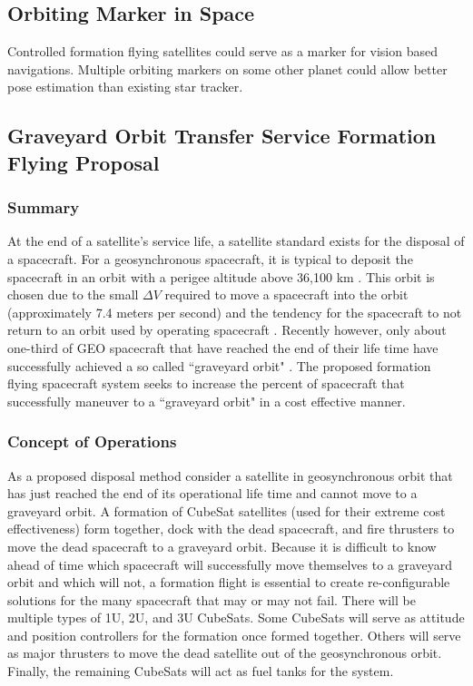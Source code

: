 \subsection{Orbiting Marker in Space}
Controlled formation flying satellites could serve as a marker for vision based navigations. Multiple orbiting markers on some other planet could allow better pose estimation than existing star tracker.

\subsection{Graveyard Orbit Transfer Service Formation Flying Proposal}
\subsubsection{Summary}
At the end of a satellite's service life, a satellite standard exists for the disposal of a spacecraft. For a geosynchronous spacecraft, it is typical to deposit the spacecraft in an orbit with a perigee altitude above 36,100 km \cite{standard}. This orbit is chosen due to the small $\Delta V$ required to move a spacecraft into the orbit (approximately 7.4 meters per second) and the tendency for the spacecraft to not return to an orbit used by operating spacecraft \cite {SMAD}. Recently however, only about one-third of GEO spacecraft that have reached the end of their life time have successfully achieved a so called ``graveyard orbit" \cite{ESA}. The proposed formation flying spacecraft system seeks to increase the percent of spacecraft that successfully maneuver to a ``graveyard orbit" in a cost effective manner. 

\subsubsection{Concept of Operations}
As a proposed disposal method consider a satellite in geosynchronous orbit that has just reached the end of its operational life time and cannot move to a graveyard orbit. A formation of CubeSat satellites (used for their extreme cost effectiveness) form together, dock with the dead spacecraft, and fire thrusters to move the dead spacecraft to a graveyard orbit. Because it is difficult to know ahead of time which spacecraft will successfully move themselves to a graveyard orbit and which will not, a formation flight is essential to create re-configurable solutions for the many spacecraft that may or may not fail. There will be multiple types of 1U, 2U, and 3U CubeSats. Some CubeSats will serve as attitude and position controllers for the formation once formed together. Others will serve as major thrusters to move the dead satellite out of the geosynchronous orbit. Finally, the remaining CubeSats will act as fuel tanks for the system.

